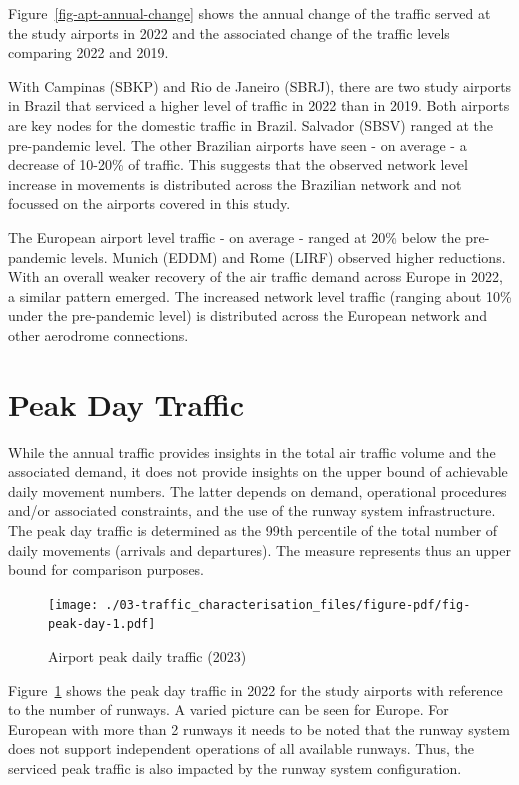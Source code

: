 \documentclass[
  a4paper,
  DIV=11,
  numbers=noendperiod]{scrreport}
\begin{document}
Figure~\ref{fig-apt-annual-change} shows the annual change of the
traffic served at the study airports in 2022 and the associated change
of the traffic levels comparing 2022 and 2019.

With Campinas (SBKP) and Rio de Janeiro (SBRJ), there are two study
airports in Brazil that serviced a higher level of traffic in 2022 than
in 2019. Both airports are key nodes for the domestic traffic in Brazil.
Salvador (SBSV) ranged at the pre-pandemic level. The other Brazilian
airports have seen - on average - a decrease of 10-20\% of traffic. This
suggests that the observed network level increase in movements is
distributed across the Brazilian network and not focussed on the
airports covered in this study.

The European airport level traffic - on average - ranged at 20\% below
the pre-pandemic levels. Munich (EDDM) and Rome (LIRF) observed higher
reductions. With an overall weaker recovery of the air traffic demand
across Europe in 2022, a similar pattern emerged. The increased network
level traffic (ranging about 10\% under the pre-pandemic level) is
distributed across the European network and other aerodrome connections.

\hypertarget{peak-day-traffic}{%
\section{Peak Day Traffic}\label{peak-day-traffic}}

While the annual traffic provides insights in the total air traffic
volume and the associated demand, it does not provide insights on the
upper bound of achievable daily movement numbers. The latter depends on
demand, operational procedures and/or associated constraints, and the
use of the runway system infrastructure. The peak day traffic is
determined as the 99th percentile of the total number of daily movements
(arrivals and departures). The measure represents thus an upper bound
for comparison purposes.

\begin{figure}[H]

{\centering \texttt{[image: ./03-traffic\_characterisation\_files/figure-pdf/fig-peak-day-1.pdf]}

}

\caption{\label{fig-peak-day}Airport peak daily traffic (2023)}

\end{figure}

Figure~\ref{fig-peak-day} shows the peak day traffic in 2022 for the
study airports with reference to the number of runways. A varied picture
can be seen for Europe. For European with more than 2 runways it needs
to be noted that the runway system does not support independent
operations of all available runways. Thus, the serviced peak traffic is
also impacted by the runway system configuration.
\end{document}
